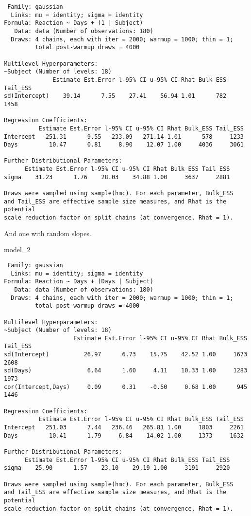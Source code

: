 \documentclass[
  letterpaper,
  DIV=11,
  numbers=noendperiod]{scrreprt}
\newenvironment{Shaded}{\begin{snugshade}}{\end{snugshade}}
\newcommand{\NormalTok}[1]{\textcolor[rgb]{0.00,0.23,0.31}{#1}}
\begin{document}
\begin{verbatim}
 Family: gaussian 
  Links: mu = identity; sigma = identity 
Formula: Reaction ~ Days + (1 | Subject) 
   Data: data (Number of observations: 180) 
  Draws: 4 chains, each with iter = 2000; warmup = 1000; thin = 1;
         total post-warmup draws = 4000

Multilevel Hyperparameters:
~Subject (Number of levels: 18) 
              Estimate Est.Error l-95% CI u-95% CI Rhat Bulk_ESS Tail_ESS
sd(Intercept)    39.14      7.55    27.41    56.94 1.01      782     1458

Regression Coefficients:
          Estimate Est.Error l-95% CI u-95% CI Rhat Bulk_ESS Tail_ESS
Intercept   251.31      9.55   233.09   271.14 1.01      578     1233
Days         10.47      0.81     8.90    12.07 1.00     4036     3061

Further Distributional Parameters:
      Estimate Est.Error l-95% CI u-95% CI Rhat Bulk_ESS Tail_ESS
sigma    31.23      1.76    28.03    34.88 1.00     3637     2881

Draws were sampled using sample(hmc). For each parameter, Bulk_ESS
and Tail_ESS are effective sample size measures, and Rhat is the potential
scale reduction factor on split chains (at convergence, Rhat = 1).
\end{verbatim}

And one with random slopes.

\begin{Shaded}
\begin{Highlighting}[]
\NormalTok{model\_2}
\end{Highlighting}
\end{Shaded}

\begin{verbatim}
 Family: gaussian 
  Links: mu = identity; sigma = identity 
Formula: Reaction ~ Days + (Days | Subject) 
   Data: data (Number of observations: 180) 
  Draws: 4 chains, each with iter = 2000; warmup = 1000; thin = 1;
         total post-warmup draws = 4000

Multilevel Hyperparameters:
~Subject (Number of levels: 18) 
                    Estimate Est.Error l-95% CI u-95% CI Rhat Bulk_ESS Tail_ESS
sd(Intercept)          26.97      6.73    15.75    42.52 1.00     1673     2608
sd(Days)                6.64      1.60     4.11    10.33 1.00     1283     1973
cor(Intercept,Days)     0.09      0.31    -0.50     0.68 1.00      945     1446

Regression Coefficients:
          Estimate Est.Error l-95% CI u-95% CI Rhat Bulk_ESS Tail_ESS
Intercept   251.03      7.44   236.46   265.81 1.00     1803     2261
Days         10.41      1.79     6.84    14.02 1.00     1373     1632

Further Distributional Parameters:
      Estimate Est.Error l-95% CI u-95% CI Rhat Bulk_ESS Tail_ESS
sigma    25.90      1.57    23.10    29.19 1.00     3191     2920

Draws were sampled using sample(hmc). For each parameter, Bulk_ESS
and Tail_ESS are effective sample size measures, and Rhat is the potential
scale reduction factor on split chains (at convergence, Rhat = 1).
\end{verbatim}
\end{document}
